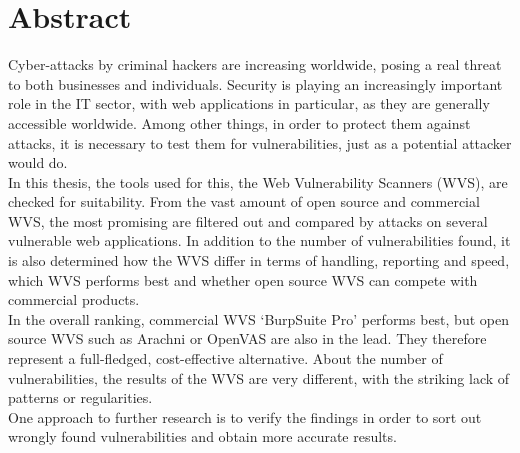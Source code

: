 \documentclass[12pt,oneside,a4paper,parskip,pointlessnumbers]{scrbook}
\begin{document}
\section*{Abstract}
Cyber-attacks by criminal hackers are increasing worldwide, posing a real threat to both businesses and individuals. Security is playing an increasingly important role in the IT sector, with web applications in particular, as they are generally accessible worldwide. Among other things, in order to protect them against attacks, it is necessary to test them for vulnerabilities, just as a potential attacker would do.\\
In this thesis, the tools used for this, the Web Vulnerability Scanners (WVS), are checked for suitability. From the vast amount of open source and commercial WVS, the most promising are filtered out and compared by attacks on several vulnerable web applications. In addition to the number of vulnerabilities found, it is also determined how the WVS differ in terms of handling, reporting and speed, which WVS performs best and whether open source WVS can compete with commercial products.\\
In the overall ranking, commercial WVS `BurpSuite Pro' performs best, but open source WVS such as Arachni or OpenVAS are also in the lead. They therefore represent a full-fledged, cost-effective alternative. About the number of vulnerabilities, the results of the WVS are very different, with the striking lack of patterns or regularities.\\
One approach to further research is to verify the findings in order to sort out wrongly found vulnerabilities and obtain more accurate results.
\setcounter{secnumdepth}{3}
\setcounter{tocdepth}{3}
\tableofcontents
\listoffigures
{}
\listoftables
{}
\end{document}
